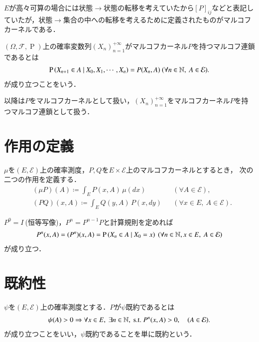 	$E$が高々可算の場合には状態$\rightarrow$状態の転移を考えていたから$[P]_{ij}$などと表記していたが，状態$\rightarrow$集合の中への転移を考えるために定義されたものがマルコフカーネルである．
	
	\begin{dfn}[マルコフ連鎖]
		$(\Omega,\mathcal{F},\operatorname{P})$上の確率変数列$(X_n)_{n=1}^{+\infty}$がマルコフカーネル$P$を持つマルコフ連鎖であるとは
		\begin{align}
			\cprob{X_{n+1} \in A}{X_0,X_1,\cdots,X_n} = P(X_n,A)\ (\forall n \in \N,\ A \in \mathcal{E}).
		\end{align}
		が成り立つことをいう．
	\end{dfn}
	
	以降は$P$をマルコフカーネルとして扱い，$(X_n)_{n=1}^{+\infty}$をマルコフカーネル$P$を持つマルコフ連鎖として扱う．
	
\section{作用の定義}
	\begin{dfn}[作用の定義]
		$\mu$を$(E,\mathcal{E})$上の確率測度，$P,Q$を$E \times \mathcal{E}$上のマルコフカーネルとするとき，
		次の二つの作用を定義する．
		\begin{align}
			& (\mu P)(A) \coloneqq \int_{E} P(x,A)\, \mu(dx) && (\forall A \in \mathcal{E}), \\
			& (PQ) (x,A) \coloneqq \int_{E} Q(y,A)\, P(x, dy) && (\forall x \in E,\ A \in \mathcal{E}).
		\end{align}
	\end{dfn}
	
	$P^0=I\ $(恒等写像)，$P^n=P^{n-1}P$と計算規則を定めれば
	\begin{align}
		P^n(x,A)=(P^n)(x,A)=\operatorname{P} \left( X_n \in A \ \middle|\ X_0 = x \right)\ (\forall n \in \mathbb{N}, x \in E,\ A \in \mathcal{E})
	\end{align}
	が成り立つ．

\section{既約性}
	\begin{dfn}[既約性]
		$\psi$を$(E,\mathcal{E})$上の確率測度とする．$P$が$\psi$既約であるとは
		\begin{align}
			\psi(A) > 0 \Rightarrow \forall x \in E,\ \exists n \in \mathbb{N},\ \mathrm{s.t.}\ P^n(x,A) > 0, \quad (A \in \mathcal{E}).
		\end{align}
		が成り立つことをいい，$\psi$既約であることを単に既約という．
	\end{dfn}
	
